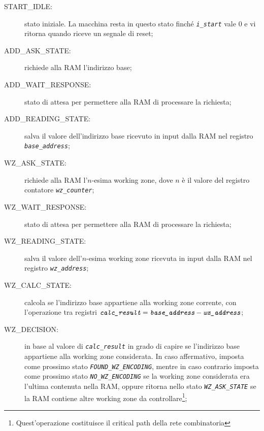 \documentclass[12pt,a4paper,titlepage]{article}
\begin{document}
		\renewcommand{\descriptionlabel}[1]{\hspace{\labelsep}\textit{#1}}
		\begin{description}
		\item[START\_IDLE:] stato iniziale. La macchina resta in questo stato finché \textit{\texttt{i\_start}} vale $0$ e vi ritorna quando riceve un segnale di reset;
		\item[ADD\_ASK\_STATE:]		richiede alla RAM l'indirizzo base;
		\item[ADD\_WAIT\_RESPONSE:]	stato di attesa per permettere alla RAM di processare la richiesta;
		\item[ADD\_READING\_STATE:]	salva il valore dell'indirizzo base ricevuto in input dalla RAM nel registro
									\textit{\texttt{base\_address}};
		\item[WZ\_ASK\_STATE:]			richiede alla RAM l'$n$-esima working zone, dove $n$ è il valore del registro contatore
									\textit{\texttt{wz\_counter}};
		\item[WZ\_WAIT\_RESPONSE:]		stato di attesa per permettere alla RAM di processare la richiesta;
		\item[WZ\_READING\_STATE:]		salva il valore dell'$n$-esima working zone ricevuta in input dalla RAM nel registro
									\textit{\texttt{wz\_address}};
		\item[WZ\_CALC\_STATE:]		calcola se l'indirizzo base appartiene alla working zone corrente, con l'operazione tra registri $\textit{\texttt{calc\_result}} = \textit{\texttt{base\_address}} - \textit{\texttt{wz\_address}}$;
		\item[WZ\_DECISION:]		in base al valore di \textit{\texttt{calc\_result}}  in grado di capire se l'indirizzo base appartiene alla working zone considerata. In caso affermativo, imposta come prossimo stato \textit{\texttt{FOUND\_WZ\_ENCODING}}, mentre in caso contrario imposta come prossimo stato \textit{\texttt{NO\_WZ\_ENCODING}} se la working zone considerata era l'ultima contenuta nella RAM, oppure ritorna nello stato \textit{\texttt{WZ\_ASK\_STATE}} se la RAM contiene altre working zone da controllare\footnote{Quest'operazione costituisce il critical path della rete combinatoria};
		

\end{description}
\end{document}
